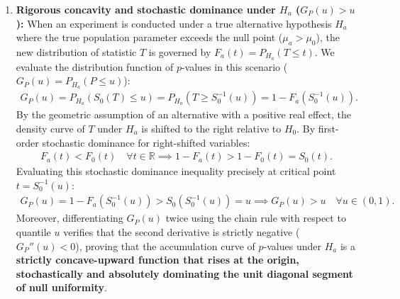 \begin{solproblema}
\begin{enumerate}
		\item \textbf{Rigorous concavity and stochastic dominance under $H_a$ ($G_P(u) > u$):}
		When an experiment is conducted under a true alternative hypothesis $H_a$ where the true population parameter exceeds the null point ($\mu_a > \mu_0$), the new distribution of statistic $T$ is governed by $F_a(t) = P_{H_a}(T \le t)$. We evaluate the distribution function of $p$-values in this scenario ($G_P(u) = P_{H_a}(P \le u)$):
		\begin{align}
			G_P(u) = P_{H_a}\left( S_0(T) \le u \right) = P_{H_a}\left( T \ge S_0^{-1}(u) \right) = 1 - F_a\left( S_0^{-1}(u) \right).
		\end{align}
		By the geometric assumption of an alternative with a positive real effect, the density curve of $T$ under $H_a$ is shifted to the right relative to $H_0$. By first-order stochastic dominance for right-shifted variables:
		\begin{align}
			F_a(t) < F_0(t) \quad \forall t \in \mathbb{R} \implies 1 - F_a(t) > 1 - F_0(t) = S_0(t).
		\end{align}
		Evaluating this stochastic dominance inequality precisely at critical point $t = S_0^{-1}(u)$:
		\begin{align}
			G_P(u) = 1 - F_a\left( S_0^{-1}(u) \right) > S_0\left( S_0^{-1}(u) \right) = u \implies G_P(u) > u \quad \forall u \in (0,1).
		\end{align}
		Moreover, differentiating $G_P(u)$ twice using the chain rule with respect to quantile $u$ verifies that the second derivative is strictly negative ($G_P''(u) < 0$), proving that the accumulation curve of $p$-values under $H_a$ is a \textbf{strictly concave-upward function that rises at the origin, stochastically and absolutely dominating the unit diagonal segment of null uniformity}.
		

\end{enumerate}
\end{solproblema}
